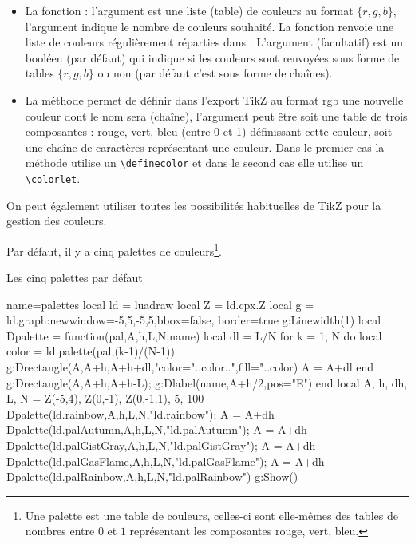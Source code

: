 \begin{itemize}
    \item La fonction  : l'argument  est une liste (table) de couleurs au format $\{r,g,b\}$, l'argument  indique le nombre de couleurs souhaité. La fonction renvoie une liste de  couleurs régulièrement réparties dans . L'argument (facultatif)  est un booléen (\false par défaut) qui indique si les couleurs sont renvoyées sous forme de tables $\{r,g,b\}$ ou non (par défaut c'est sous forme de chaînes).  
    
    \item La méthode  permet de définir dans l'export TikZ au format rgb une nouvelle couleur dont le nom sera  (chaîne), l'argument  peut être soit une table de trois composantes : rouge, vert, bleu (entre 0 et 1) définissant cette couleur, soit une chaîne de caractères représentant une couleur. Dans le premier cas la méthode utilise un \verb|\definecolor| et dans le second cas elle utilise un \verb|\colorlet|.
    
\end{itemize}
On peut également utiliser toutes les possibilités habituelles de TikZ pour la gestion des couleurs.

Par défaut, il y a cinq palettes de couleurs\footnote{Une palette est une table de couleurs, celles-ci sont elle-mêmes des tables de nombres entre $0$ et $1$ représentant les composantes rouge, vert, bleu.}.

\begin{demo}{Les cinq palettes par défaut}
\begin{luadraw}{name=palettes}
local ld = luadraw
local Z = ld.cpx.Z
local g = ld.graph:new{window={-5,5,-5,5},bbox=false, border=true}
g:Linewidth(1)
local Dpalette = function(pal,A,h,L,N,name)
    local dl = L/N
    for k = 1, N do
        local color = ld.palette(pal,(k-1)/(N-1))
        g:Drectangle(A,A+h,A+h+dl,"color="..color..",fill="..color)
        A = A+dl
    end
    g:Drectangle(A,A+h,A+h-L); g:Dlabel(name,A+h/2,{pos="E"})
end
local A, h, dh, L, N = Z(-5,4), Z(0,-1), Z(0,-1.1), 5, 100
Dpalette(ld.rainbow,A,h,L,N,"ld.rainbow"); A = A+dh
Dpalette(ld.palAutumn,A,h,L,N,"ld.palAutumn"); A = A+dh
Dpalette(ld.palGistGray,A,h,L,N,"ld.palGistGray"); A = A+dh
Dpalette(ld.palGasFlame,A,h,L,N,"ld.palGasFlame"); A = A+dh
Dpalette(ld.palRainbow,A,h,L,N,"ld.palRainbow")
g:Show()
\end{luadraw}
\end{demo}
